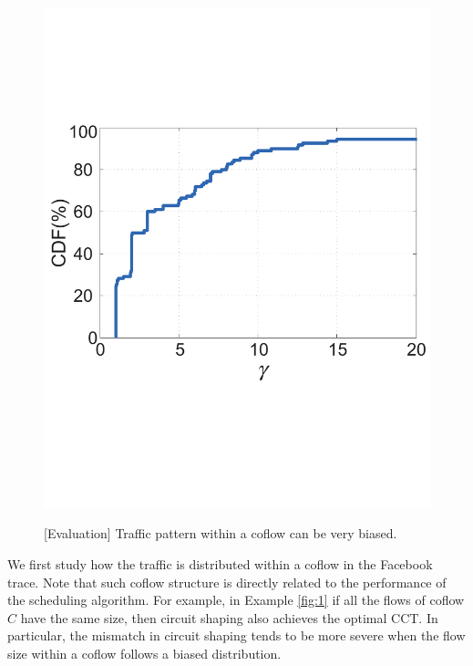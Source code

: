 \begin{figure}[t]
{    \includegraphics[scale=0.195]{figures/size311}%
  }
  \caption{[Evaluation] Traffic pattern within a coflow can be very biased.}
  \label{fig:trace}
\end{figure}


We first study how the traffic is distributed within a coflow in the Facebook trace. Note that such coflow structure is directly related to the performance of the scheduling algorithm.  For example, in Example \ref{fig:1} if all the flows of coflow $C$  have the same size, then circuit shaping also achieves the optimal CCT.
In particular,
the mismatch in circuit shaping tends to be more severe when the flow size within a coflow follows a biased distribution.

